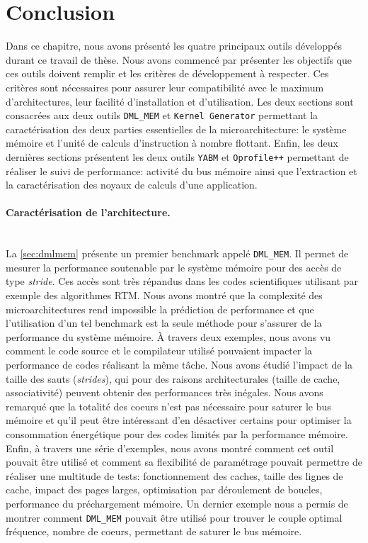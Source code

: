 \section{Conclusion}\label{sec:dev_conclusion}
    
    Dans ce chapitre, nous avons présenté les quatre principaux outils développés durant ce travail de thèse. Nous avons commencé par présenter les objectifs que ces outils doivent remplir et les critères de développement à respecter. Ces critères sont nécessaires pour assurer leur compatibilité avec le maximum d'architectures, leur facilité d'installation et d'utilisation. 
    Les deux sections sont consacrées aux deux outils \verb|DML_MEM| et \verb|Kernel Generator| permettant la caractérisation des deux parties essentielles de la microarchitecture: le système mémoire et l'unité de calculs d'instruction à nombre flottant. Enfin, les deux dernières sections présentent les deux outils \verb|YABM| et \verb|Oprofile++| permettant de réaliser le suivi de performance: activité du bus mémoire ainsi que l'extraction et la caractérisation des noyaux de calculs d'une application.

\paragraph{Caractérisation de l'architecture.}
~\\
    
    La \autoref{sec:dmlmem} présente un premier benchmark appelé \verb|DML_MEM|. Il permet de mesurer la performance soutenable par le système  mémoire pour des accès de type \textit{stride}. Ces accès sont très répandus dans les codes scientifiques utilisant par exemple des algorithmes RTM. Nous avons montré que la complexité des microarchitectures rend impossible la prédiction de performance et que l'utilisation d'un tel benchmark est la seule méthode pour s'assurer de la performance du système mémoire. À travers deux exemples, nous avons vu comment le code source et le compilateur utilisé pouvaient impacter la performance de codes réalisant la même tâche. Nous avons étudié l'impact de la taille des sauts (\textit{strides}), qui pour des raisons architecturales (taille de cache, associativité) peuvent obtenir des performances très inégales. Nous avons remarqué que la totalité des coeurs n'est pas nécessaire pour saturer le bus mémoire et qu'il peut être intéressant d'en désactiver certains pour optimiser la consommation énergétique pour des codes limités par la performance mémoire. Enfin, à travers une série d'exemples, nous avons montré comment cet outil pouvait être utilisé et comment sa flexibilité de paramétrage pouvait permettre de réaliser une multitude de tests: fonctionnement des caches, taille des lignes de cache, impact des pages larges, optimisation par déroulement de boucles, performance du préchargement mémoire. Un dernier exemple nous a permis de montrer comment \verb|DML_MEM| pouvait être utilisé pour trouver le couple optimal {fréquence, nombre de coeurs}, permettant de saturer le bus mémoire.\\
    
